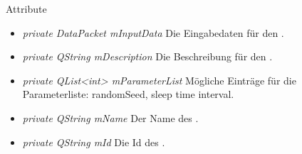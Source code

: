 Attribute
\begin{itemize}
\item\textit{private DataPacket mInputData} Die Eingabedaten für den .
\item\textit{private QString mDescription} Die Beschreibung für den .
\item\textit{private QList<int> mParameterList} Mögliche Einträge für die Parameterliste: randomSeed, sleep time interval.
\item\textit{private QString mName} Der Name des .
\item\textit{private QString mId} Die Id des .
\end{itemize}

